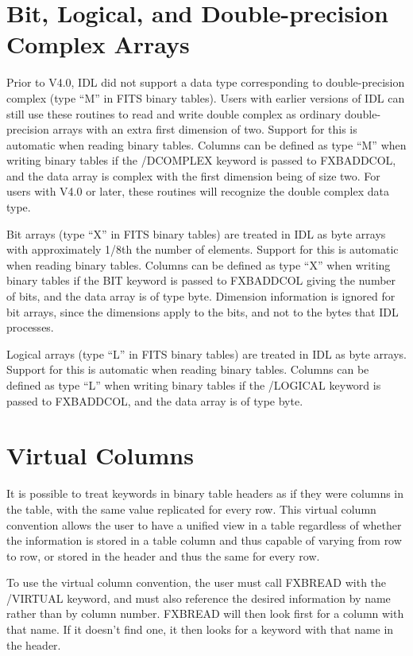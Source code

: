 \section{Bit, Logical, and Double-precision Complex Arrays}

Prior to V4.0, IDL did not support a data type corresponding to double-precision
complex (type ``M'' in FITS binary tables).   Users with earlier versions of
IDL can still use these routines to read and write
double complex as ordinary double-precision arrays with an extra first
dimension of two.  Support for this is automatic when reading binary tables.
Columns can be defined as type ``M'' when writing binary tables if the
/DCOMPLEX keyword is passed to FXBADDCOL, and the data array is complex with
the first dimension being of size two.    For users with V4.0 or later,
these routines will recognize the double complex data type.

Bit arrays (type ``X'' in FITS binary tables) are treated in IDL as byte arrays
with approximately 1/8th the number of elements.  Support for this is automatic
when reading binary tables.  Columns can be defined as type ``X'' when writing
binary tables if the BIT keyword is passed to FXBADDCOL giving the number of
bits, and the data array is of type byte.  Dimension information is ignored for
bit arrays, since the dimensions apply to the bits, and not to the bytes that
IDL processes.

Logical arrays (type ``L'' in FITS binary tables) are treated in IDL as byte
arrays.  Support for this is automatic when reading binary tables.  Columns can
be defined as type ``L'' when writing binary tables if the /LOGICAL keyword is
passed to FXBADDCOL, and the data array is of type byte.

\section{Virtual Columns}

It is possible to treat keywords in binary table headers as if they were
columns in the table, with the same value replicated for every row.  This
virtual column convention allows the user to have a unified view in a table
regardless of whether the information is stored in a table column and thus
capable of varying from row to row, or stored in the header and thus the same
for every row.

To use the virtual column convention, the user must call FXBREAD with the
/VIRTUAL keyword, and must also reference the desired information by name
rather than by column number.  FXBREAD will then look first for a column with
that name.  If it doesn't find one, it then looks for a keyword with that name
in the header.

